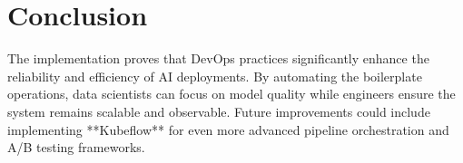 \documentclass[12pt,a4paper]{article}
\begin{document}
\section{Conclusion}
The implementation proves that DevOps practices significantly enhance the reliability and efficiency of AI deployments. By automating the boilerplate operations, data scientists can focus on model quality while engineers ensure the system remains scalable and observable. Future improvements could include implementing **Kubeflow** for even more advanced pipeline orchestration and A/B testing frameworks.
\end{document}
